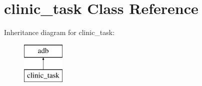 \hypertarget{classclinic__task}{}\section{clinic\+\_\+task Class Reference}
\label{classclinic__task}
Inheritance diagram for clinic\+\_\+task\+:\begin{figure}[H]
\begin{center}
\leavevmode
\includegraphics[height=2.000000cm]{classclinic__task}
\end{center}
\end{figure}
